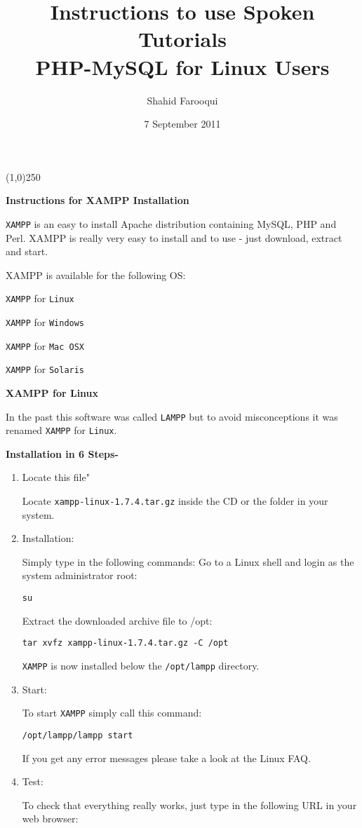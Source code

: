 \documentclass[11pt]{article}
\title{Instructions to use Spoken Tutorials \\
PHP-MySQL for Linux Users}
\author{Shahid Farooqui}
\date{7 September 2011}
\newenvironment{enumcpt}{\begin{enumerate} \topsep 0pt \partopsep 0pt 
                        \parsep 0pt
                        \itemsep 0pt \leftmargin -1in \rightmargin 0pt
                        }{\end{enumerate}}
\begin{document}
\begin{center}
\line(1,0){250}
\end{center}
\begin{center}
\textbf {Instructions for XAMPP Installation}
\end{center}
\begin{multicols}{2}
{\tt XAMPP} is an easy to install Apache distribution containing MySQL, PHP and Perl. XAMPP is really very easy to install and to use - just download, extract and start. 

XAMPP is available for the following OS:

{\tt XAMPP} for {\tt Linux}

{\tt XAMPP} for {\tt Windows}

{\tt XAMPP} for {\tt Mac OSX}

{\tt XAMPP} for {\tt Solaris}

\textbf {XAMPP for Linux}

In the past this software was called {\tt LAMPP} but to avoid misconceptions it was renamed {\tt XAMPP} for {\tt Linux}.
 
\textbf {Installation in 6 Steps-}
\begin{enumcpt}
\item Locate this file"

Locate {\tt xampp-linux-1.7.4.tar.gz} inside the CD or the folder in your system.

\item Installation:

Simply type in the following commands:
Go to a Linux shell and login as the system administrator root:

  {\tt su}

Extract the downloaded archive file to /opt:

  {\tt tar xvfz xampp-linux-1.7.4.tar.gz -C /opt}

{\tt XAMPP} is now installed below the {\tt /opt/lampp} directory. 

\item Start:

To start {\tt XAMPP} simply call this command:

{\tt /opt/lampp/lampp start}

If you get any error messages please take a look at the Linux FAQ. 

\item Test:

To check that everything really works, just type in the following URL in your web browser: 


\end{enumcpt}
\end{multicols}
\end{document}
